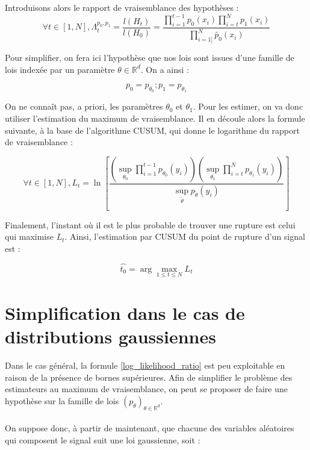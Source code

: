 \documentclass[french,12pt,notitlepage]{report}
\begin{document}
	Introduisons alors le rapport de vraisemblance des hypothèses :
	\begin{equation}
		\forall t \in [1, N], \Lambda_t^{p_0, p_1} = \frac{l(H_t)}{l(H_0)} = \frac{\prod_{i = 1}^{t-1} p_0(x_i) \prod_{i = t}^{N} p_1(x_i)}{\prod_{i = 1]}^{N} \tilde{p_0}(x_i)}
	\end{equation}
	
	Pour simplifier, on fera ici l'hypothèse que nos lois sont issues d'une famille de lois indexée par un paramètre $\theta \in \mathbb{R}^d$. On a ainsi :
	
	\begin{equation*}
		p_0 = p_{\theta_0} ; p_1 = p_{\theta_1}
	\end{equation*}
	
	On ne connaît pas, a priori, les paramètres $\theta_0$ et $\theta_1$. Pour les estimer, on va donc utiliser l'estimation du maximum de vraisemblance. Il en découle alors la formule suivante, à la base de l'algorithme CUSUM, qui donne le logarithme du rapport de vraisemblance :
	
	\begin{equation}
		\forall t \in [1, N], L_t=\ln\left[\frac{\left(\sup_{\theta_0}\prod_{i=1}^{t-1}p_{\theta_0}(y_i)\right)\left(\sup_{\theta_1}\prod_{i=t}^Np_{\theta_1}(y_i)\right)}{\sup_{\tilde\theta}p_{\tilde\theta}(y_i)}\right]
		\label{log_likelihood_ratio}
	\end{equation}
	
	Finalement, l'instant où il est le plus probable de trouver une rupture est celui qui maximise $L_t$. Ainsi, l'estimation par CUSUM du point de rupture d'un signal est :
	
	\begin{equation}
		\hat{t_0}=\arg\max_{1\le t\le N}L_t
	\end{equation}
	
	\section{Simplification dans le cas de distributions gaussiennes}
	Dans le cas général, la formule \ref{log_likelihood_ratio} est peu exploitable en raison de la présence de bornes supérieures. Afin de simplifier le problème des estimateurs au maximum de vraisemblance, on peut se proposer de faire une hypothèse sur la famille de lois $(p_\theta)_{\theta \in \mathbb{R}^d}$.
	\\ \\
	On suppose donc, à partir de maintenant, que chacune des variables aléatoires qui composent le signal suit une loi gaussienne, soit :
	
\end{document}
